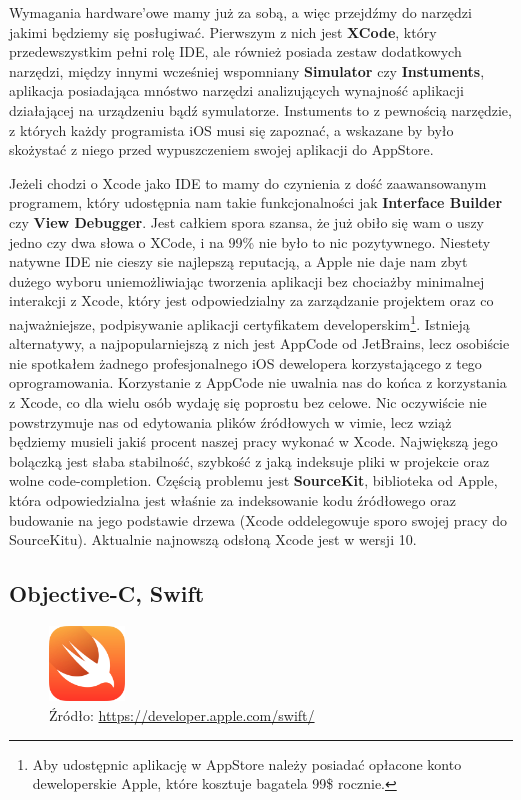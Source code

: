 \documentclass{article}
\begin{document}
Wymagania hardware'owe mamy już za sobą, a więc przejdźmy do narzędzi jakimi będziemy
się posługiwać. Pierwszym z nich jest \textbf{XCode}, który przedewszystkim pełni
rolę IDE, ale również posiada zestaw dodatkowych narzędzi, między innymi wcześniej
wspomniany \textbf{Simulator} czy \textbf{Instuments}, aplikacja posiadająca mnóstwo
narzędzi analizujących wynajność aplikacji działającej na urządzeniu bądź symulatorze.
Instuments to z pewnością narzędzie, z których każdy programista iOS musi się
zapoznać, a wskazane by było skożystać z niego przed wypuszczeniem swojej aplikacji
do AppStore.

Jeżeli chodzi o Xcode jako IDE to mamy do czynienia z dość zaawansowanym programem,
który udostępnia nam takie funkcjonalności jak \textbf{Interface Builder} czy
\textbf{View Debugger}. Jest całkiem spora szansa, że już obiło się wam o uszy
jedno czy dwa słowa o XCode, i na 99\% nie było to nic pozytywnego. Niestety 
natywne IDE nie cieszy sie najlepszą reputacją, a Apple nie daje nam zbyt dużego 
wyboru uniemożliwiając tworzenia aplikacji bez chociażby minimalnej interakcji
z Xcode, który jest odpowiedzialny za zarządzanie projektem oraz co najważniejsze,
podpisywanie aplikacji certyfikatem developerskim\footnote{Aby udostępnic aplikację
w AppStore należy posiadać opłacone konto deweloperskie Apple, które kosztuje 
bagatela 99\$ rocznie.}. Istnieją alternatywy, a najpopularniejszą z nich jest
AppCode od JetBrains, lecz osobiście nie spotkałem żadnego profesjonalnego iOS
dewelopera korzystającego z tego oprogramowania. Korzystanie z AppCode nie
uwalnia nas do końca z korzystania z Xcode, co dla wielu osób wydaję się poprostu
bez celowe. Nic oczywiście nie powstrzymuje nas od edytowania plików źródłowych
w vimie, lecz wziąż będziemy musieli jakiś procent naszej pracy wykonać w Xcode.
Największą jego bolączką jest słaba stabilność, szybkość z jaką indeksuje
pliki w projekcie oraz wolne code-completion. Częścią problemu jest 
\textbf{SourceKit}, biblioteka od Apple, która odpowiedzialna jest właśnie za
indeksowanie kodu źródłowego oraz budowanie na jego podstawie drzewa (Xcode 
oddelegowuje sporo swojej pracy do SourceKitu). Aktualnie najnowszą odsłoną
Xcode jest w wersji 10.

\subsection*{Objective-C, Swift}

\begin{figure}[h]
\centering
\includegraphics[width=2cm]{swift-128x128_2x}
\caption{Źródło: \url{https://developer.apple.com/swift/}}
\end{figure}
\end{document}
